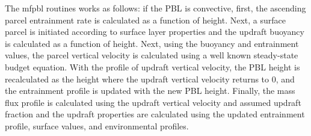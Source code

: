 The mfpbl routines works as follows\+: if the P\+BL is convective, first, the ascending parcel entrainment rate is calculated as a function of height. Next, a surface parcel is initiated according to surface layer properties and the updraft buoyancy is calculated as a function of height. Next, using the buoyancy and entrainment values, the parcel vertical velocity is calculated using a well known steady-\/state budget equation. With the profile of updraft vertical velocity, the P\+BL height is recalculated as the height where the updraft vertical velocity returns to 0, and the entrainment profile is updated with the new P\+BL height. Finally, the mass flux profile is calculated using the updraft vertical velocity and assumed updraft fraction and the updraft properties are calculated using the updated entrainment profile, surface values, and environmental profiles. 
